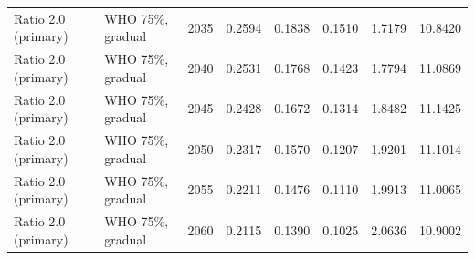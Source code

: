 \begin{longtable}{llrrrrrr}
Ratio 2.0 (primary) & WHO 75\%, gradual & 2035 & 0.2594 & 0.1838 & 0.1510 & 1.7179 & 10.8420 \\
Ratio 2.0 (primary) & WHO 75\%, gradual & 2040 & 0.2531 & 0.1768 & 0.1423 & 1.7794 & 11.0869 \\
Ratio 2.0 (primary) & WHO 75\%, gradual & 2045 & 0.2428 & 0.1672 & 0.1314 & 1.8482 & 11.1425 \\
Ratio 2.0 (primary) & WHO 75\%, gradual & 2050 & 0.2317 & 0.1570 & 0.1207 & 1.9201 & 11.1014 \\
Ratio 2.0 (primary) & WHO 75\%, gradual & 2055 & 0.2211 & 0.1476 & 0.1110 & 1.9913 & 11.0065 \\
Ratio 2.0 (primary) & WHO 75\%, gradual & 2060 & 0.2115 & 0.1390 & 0.1025 & 2.0636 & 10.9002 \\
\end{longtable}
\normalsize
